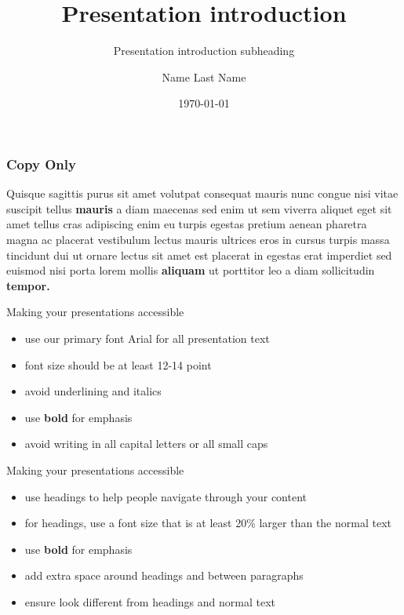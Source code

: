 \documentclass{beamer}
\author[]{Name Last Name}
\title[]{Presentation introduction}
\subtitle[]{Presentation introduction subheading}
\institute{MRC Biostatistics Unit}
\date{\today}
\begin{document}
\begin{frame}[plain]
\titlepage
\setcounter{framenumber}{0}
\end{frame}
%

\begin{frame}[t]%
  \frametitle[right]{Copy Only}
    Quisque sagittis purus sit amet volutpat consequat mauris nunc congue nisi vitae suscipit tellus \textbf{mauris} a diam maecenas sed enim ut sem viverra aliquet eget sit amet tellus cras adipiscing enim eu turpis egestas pretium aenean pharetra magna ac placerat vestibulum lectus mauris ultrices eros in cursus turpis massa tincidunt dui ut ornare lectus sit amet est placerat in egestas erat imperdiet sed euismod nisi porta lorem mollis \textbf{aliquam} ut porttitor leo a diam sollicitudin \textbf{tempor.}
\end{frame}

\begin{frame}[t]{Making your presentations accessible}
  \begin{itemize}
    \item use our primary font Arial for all presentation text
    \item font size should be at least 12-14 point
    \item avoid underlining and italics
    \item use \textbf{bold} for emphasis
    \item avoid writing in all capital letters or all small caps
  \end{itemize}
\end{frame}

\begin{frame}[t]{Making your presentations accessible}
    \begin{itemize}
      \item use headings to help people navigate through your content
      \item for headings, use a font size that is at least 20\% larger than the normal text
      \item use \textbf{bold} for emphasis
      \item add extra space around headings and between paragraphs
      \item ensure \alert{\underline{}} look different from headings and normal text
    \end{itemize}
  \end{frame}
\end{document}

